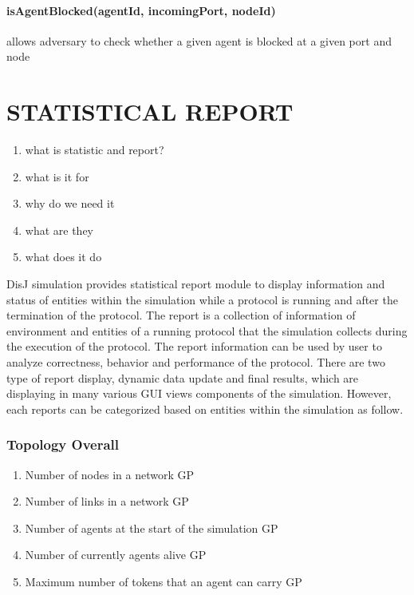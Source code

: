 \paragraph{isAgentBlocked(agentId, incomingPort, nodeId)} allows adversary to check whether a given agent is blocked at a given port and node



\section{STATISTICAL REPORT}
\begin{enumerate}
\item what is statistic and report?
\item what is it for
\item why do we need it

\item what are they
\item what does it do
\end{enumerate}

DisJ simulation provides statistical report module to display information and status of entities within the simulation while a protocol is running and after the termination of the protocol. The report is a collection of information of environment and entities of a running protocol that the simulation collects during the execution of the protocol. The report information can be used by user to analyze correctness, behavior and performance of the protocol. There are two type of report display, dynamic data update and final results, which are displaying in many various GUI views components of the simulation. However, each reports can be categorized based on entities within the simulation as follow.


\subsubsection*{Topology Overall}
\begin{enumerate}
\item Number of nodes in a network GP
\item Number of links in a network GP
\item Number of agents at the start of the simulation GP
\item Number of currently agents alive GP
\item Maximum number of tokens that an agent can carry GP
\end{enumerate}


